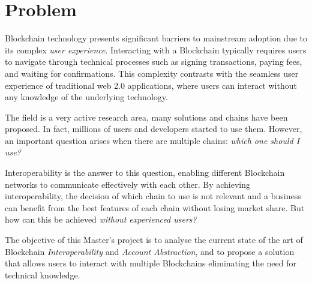 \chapter{Problem}
\label{chap:problem}

Blockchain technology presents significant barriers to mainstream adoption due to its complex \textit{user experience}. Interacting with a Blockchain typically requires users to navigate through technical processes such as signing transactions, paying fees, and waiting for confirmations. This complexity contrasts with the seamless user experience of traditional web 2.0 applications, where users can interact without any knowledge of the underlying technology.

The field is a very active research area, many solutions and chains have been proposed. In fact, millions of users and developers started to use them. \cite{blockchain-statistics} However, an important question arises when there are multiple chains: \textit{which one should I use?}

Interoperability is the answer to this question, enabling different Blockchain networks to communicate effectively with each other. By achieving interoperability, the decision of which chain to use is not relevant and a business can benefit from the best features of each chain without losing market share. But how can this be achieved \textit{without experienced users?}

The objective of this Master's project is to analyse the current state of the art of Blockchain \textit{Interoperability} and \textit{Account Abstraction}, and to propose a solution that allows users to interact with multiple Blockchains eliminating the need for technical knowledge.

